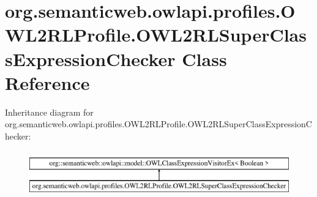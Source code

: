\hypertarget{classorg_1_1semanticweb_1_1owlapi_1_1profiles_1_1_o_w_l2_r_l_profile_1_1_o_w_l2_r_l_super_class_expression_checker}{\section{org.\-semanticweb.\-owlapi.\-profiles.\-O\-W\-L2\-R\-L\-Profile.\-O\-W\-L2\-R\-L\-Super\-Class\-Expression\-Checker Class Reference}
\label{classorg_1_1semanticweb_1_1owlapi_1_1profiles_1_1_o_w_l2_r_l_profile_1_1_o_w_l2_r_l_super_class_expression_checker}
}
Inheritance diagram for org.\-semanticweb.\-owlapi.\-profiles.\-O\-W\-L2\-R\-L\-Profile.\-O\-W\-L2\-R\-L\-Super\-Class\-Expression\-Checker\-:\begin{figure}[H]
\begin{center}
\leavevmode
\includegraphics[height=2.000000cm]{classorg_1_1semanticweb_1_1owlapi_1_1profiles_1_1_o_w_l2_r_l_profile_1_1_o_w_l2_r_l_super_class_expression_checker}
\end{center}
\end{figure}
